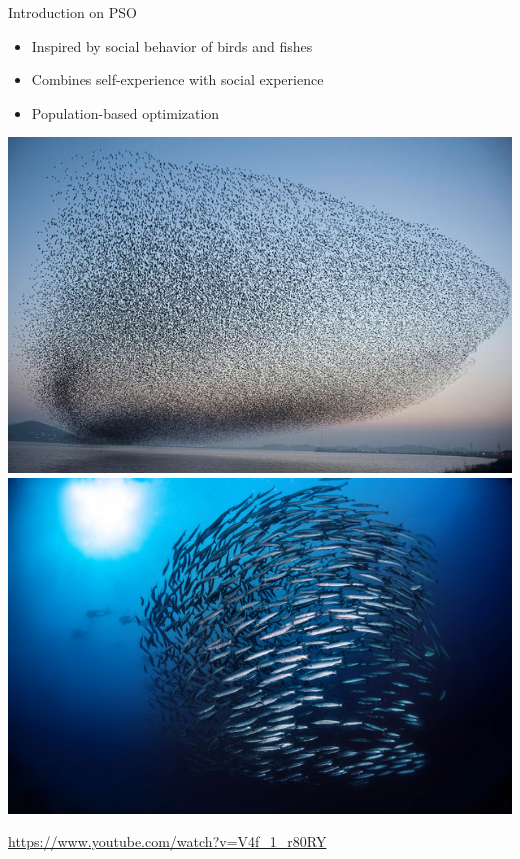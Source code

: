 \documentclass[pdflatex,compress,mathserif]{beamer}
\begin{document}
\begin{frame}{Introduction on PSO}
	\begin{itemize}
		\item Inspired by social behavior of birds and fishes
		\item Combines self-experience with social experience
		\item Population-based optimization
	\end{itemize}
	\begin{multicols}{2}
		\includegraphics[width=\linewidth]{img/02}
		\columnbreak
		\includegraphics[width=\linewidth]{img/03}
	\end{multicols}
	\centering \href{https://www.youtube.com/watch?v=V4f\_1\_r80RY}{https://www.youtube.com/watch?v=V4f\_1\_r80RY}
\end{frame}
\end{document}
